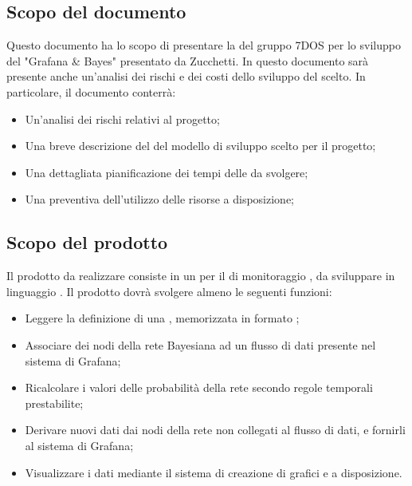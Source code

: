 \subsection{Scopo del documento}
Questo documento ha lo scopo di presentare la  del gruppo 7DOS per lo sviluppo del  "Grafana \& Bayes" presentato da Zucchetti. In questo documento sarà presente anche un'analisi dei rischi e dei costi dello sviluppo del  scelto.
In particolare, il documento conterrà:
\begin{itemize}
	\item Un'analisi dei rischi relativi al progetto;
	\item Una breve descrizione del del modello di sviluppo scelto per il progetto;
	\item Una dettagliata pianificazione dei tempi delle  da svolgere;
	\item Una  preventiva dell'utilizzo delle risorse a disposizione;
\end{itemize}


\subsection{Scopo del prodotto}
Il prodotto da realizzare consiste in un  per il  di monitoraggio , da sviluppare in linguaggio . Il prodotto dovrà svolgere almeno le seguenti funzioni:
\begin{itemize}
	\item{Leggere la definizione di una , memorizzata in formato ;}
	\item{Associare dei nodi della rete Bayesiana ad un flusso di dati presente nel sistema di Grafana;}
	\item{Ricalcolare i valori delle probabilità della rete secondo regole temporali prestabilite;}
	\item{Derivare nuovi dati dai nodi della rete non collegati al flusso di dati, e fornirli al sistema di Grafana;}
	\item{Visualizzare i dati mediante il sistema di creazione di grafici e  a disposizione.}
\end{itemize}

